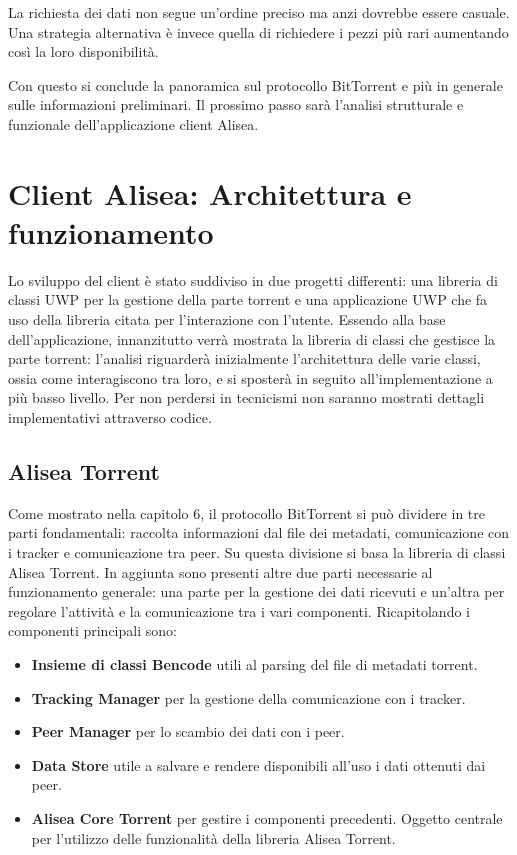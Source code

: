 \documentclass[a4]{book}
\begin{document}
La richiesta dei dati non segue un'ordine preciso ma anzi dovrebbe essere casuale. Una strategia alternativa è invece  quella di richiedere i pezzi più rari aumentando così la loro disponibilità.\newline

Con questo si conclude la panoramica sul protocollo BitTorrent e più in generale sulle informazioni preliminari. Il prossimo passo sarà l'analisi strutturale e funzionale dell'applicazione client Alisea.


\chapter{Client Alisea: Architettura e funzionamento}
Lo sviluppo del client è stato suddiviso in due progetti differenti: una libreria di classi UWP per la gestione della parte torrent e una applicazione UWP che fa uso della libreria citata per l'interazione con l'utente. Essendo alla base dell'applicazione, innanzitutto verrà mostrata la libreria di classi che gestisce la parte torrent: l'analisi riguarderà inizialmente l'architettura delle varie classi, ossia come interagiscono tra loro, e si sposterà in seguito all'implementazione a più basso livello. Per non perdersi in tecnicismi non saranno mostrati dettagli implementativi attraverso codice.

\section{Alisea Torrent}
Come mostrato nella capitolo 6, il protocollo BitTorrent si può dividere in tre parti fondamentali: raccolta informazioni dal file dei metadati, comunicazione con i tracker e comunicazione tra peer. Su questa divisione si basa la libreria di classi Alisea Torrent. In aggiunta sono presenti altre due parti necessarie al funzionamento generale: una parte per la gestione dei dati ricevuti e un'altra per regolare l'attività e la comunicazione tra i vari componenti. Ricapitolando i componenti principali sono:
\begin{itemize}
	\item\textbf{Insieme di classi Bencode} utili al parsing del file di metadati torrent.
	\item\textbf{Tracking Manager} per la gestione della comunicazione con i tracker.
	\item\textbf{Peer Manager} per lo scambio dei dati con i peer.
	\item\textbf{Data Store} utile a salvare e rendere disponibili all'uso i dati ottenuti dai peer.
	\item\textbf{Alisea Core Torrent} per gestire i componenti precedenti. Oggetto centrale per l'utilizzo delle funzionalità della libreria Alisea Torrent.
\end{itemize}
\end{document}
